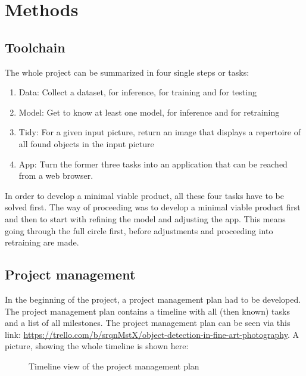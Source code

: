 \chapter{Methods}

\section{Toolchain}

The whole project can be summarized in four single steps or tasks:
\begin{enumerate}
	\item Data: Collect a dataset, for inference, for training and for testing
	\item Model: Get to know at least one model, for inference and for retraining
	\item Tidy: For a given input picture, return an image that displays a repertoire of all found objects in the input picture
	\item App: Turn the former three tasks into an application that can be reached from a web browser.
\end{enumerate}

In order to develop a minimal viable product, all these four tasks have to be solved first. The way of proceeding was to develop a minimal viable product first and then to start with refining the model and adjusting the app. This means going through the full circle first, before adjustments and proceeding into retraining are made.

\section{Project management}

In the beginning of the project, a project management plan had to be developed. The project management plan contains a timeline with all (then known) tasks and a list of all milestones. The project management plan can be seen via this link: \url{https://trello.com/b/srqnMstX/object-detection-in-fine-art-photography}. A picture, showing the whole timeline is shown here:

 \begin{figure}
	\caption{\label{fig:project-management-plan} Timeline view of the project management plan}
\end{figure}

